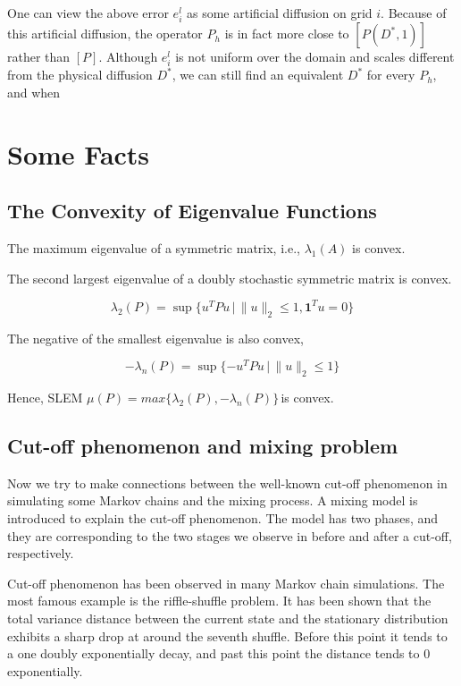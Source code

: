
One can view the above error $e_i^l$ as some artificial diffusion on
grid $i$. Because of this artificial diffusion, the operator $P_h$
is in fact more close to $[P(D^*,1)]$ rather than $[P]$. Although
$e_i^l$ is not uniform over the domain and scales different from the
physical diffusion $D^*$, we can still find an equivalent $D^*$ for
every $P_h$, and when


\section{Some Facts}




\subsection{The Convexity of Eigenvalue Functions}
The maximum eigenvalue of a symmetric matrix, i.e., $\lambda_{1}(A)$ is convex.

The second largest eigenvalue of a doubly stochastic symmetric matrix is convex.

$$\lambda_{2}(P)=\sup\{u^{T}Pu \,|\, \|u\|_{2}\le1, \mathbf{1}^{T}u=0\}$$

The negative of the smallest eigenvalue is also convex,

$$-\lambda_{n}(P)=\sup\{ -u^{T}Pu \,|\, \|u\|_{2}\le1 \}$$

Hence, SLEM $\mu(P)=max\{\lambda_{2}(P),-\lambda_{n}(P)\}\,$is convex.



\subsection{Cut-off phenomenon and mixing problem}
Now we try to make connections between the well-known cut-off phenomenon in simulating some Markov chains and the mixing process. A mixing model is introduced to explain the cut-off phenomenon. The model has two phases, and they are corresponding to the two stages we observe in before and after a cut-off, respectively. 

Cut-off phenomenon has been observed in many Markov chain simulations. The most famous example is the riffle-shuffle problem. It has been shown that the total variance distance between the current state and the stationary distribution exhibits a sharp drop at around the seventh shuffle. Before this point it tends to a one doubly exponentially decay, and past this point the distance tends to $0$ exponentially. 

